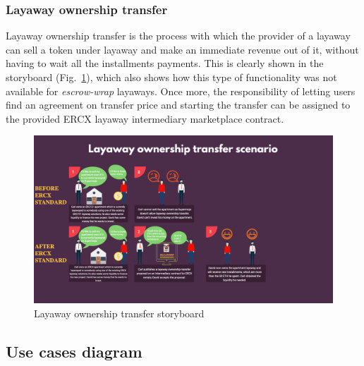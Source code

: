 \documentclass[english, LaM, oneside]{sapthesis}%
\begin{document}
\subsubsection{Layaway ownership transfer}
Layaway ownership transfer is the process with which the provider of a layaway can sell a token under layaway and make an immediate revenue out of it, without having to wait all the installments payments. This is clearly shown in the storyboard (Fig.~\ref{fig:LayawayOwnershipTransfer SB}), which also shows how this type of functionality was not available for \textit{escrow-wrap} layaways. \newline
Once more, the responsibility of letting users find an agreement on transfer price and starting the transfer can be assigned to the provided ERCX layaway intermediary marketplace contract.

\begin{figure}[H]
    \centering
        \begin{adjustbox}{width=1\textwidth}
            \includegraphics{storyboards/layawayTransfer.pdf}
        \end{adjustbox}
    \caption{Layaway ownership transfer storyboard}
    \label{fig:LayawayOwnershipTransfer SB}
\end{figure}

\subsection{Use cases diagram}
\end{document}

